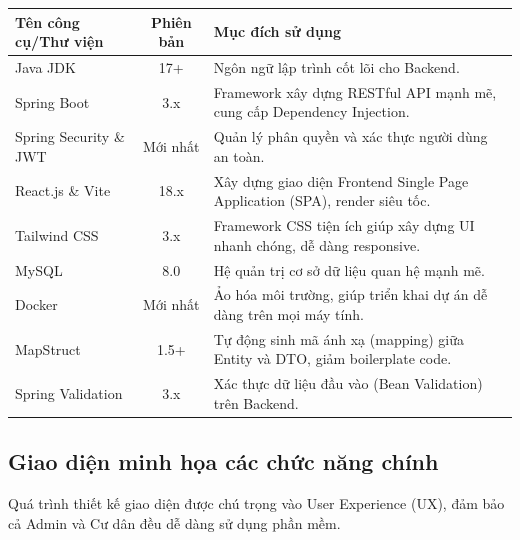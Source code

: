 \documentclass[12pt,a4paper]{article}
\begin{document}
\begin{table}[H]
    \centering
    \begin{tabularx}{\textwidth}{|L{3.5cm}|c|X|}
    \hline
    \textbf{Tên công cụ/Thư viện} & \textbf{Phiên bản} & \textbf{Mục đích sử dụng} \\
    \hline
    Java JDK & 17+ & Ngôn ngữ lập trình cốt lõi cho Backend. \\
    \hline
    Spring Boot & 3.x & Framework xây dựng RESTful API mạnh mẽ, cung cấp Dependency Injection. \\
    \hline
    Spring Security \& JWT & Mới nhất & Quản lý phân quyền và xác thực người dùng an toàn. \\
    \hline
    React.js \& Vite & 18.x & Xây dựng giao diện Frontend Single Page Application (SPA), render siêu tốc. \\
    \hline
    Tailwind CSS & 3.x & Framework CSS tiện ích giúp xây dựng UI nhanh chóng, dễ dàng responsive. \\
    \hline
    MySQL & 8.0 & Hệ quản trị cơ sở dữ liệu quan hệ mạnh mẽ. \\
    \hline
    Docker & Mới nhất & Ảo hóa môi trường, giúp triển khai dự án dễ dàng trên mọi máy tính. \\
    \hline
    MapStruct & 1.5+ & Tự động sinh mã ánh xạ (mapping) giữa Entity và DTO, giảm boilerplate code. \\
    \hline
    Spring Validation & 3.x & Xác thực dữ liệu đầu vào (Bean Validation) trên Backend. \\
    \hline
    \end{tabularx}
\end{table}

\subsection{Giao diện minh họa các chức năng chính}

Quá trình thiết kế giao diện được chú trọng vào User Experience (UX), đảm bảo cả Admin và Cư dân đều dễ dàng sử dụng phần mềm.
\end{document}
